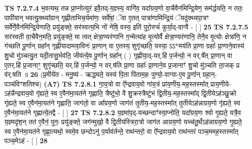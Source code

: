 \documentclass[17pt]{extarticle}
\begin{document}
                  \newline
                                \textbf{ TS 7.2.7.4} \newline
                  भ॒वत्यथ॒ तन्न प्रा॒प्नोत्युर॑ इवै॒तद्-य॒ज्ञ्स्य॒ वागि॑व॒ यदा᳚ग्रय॒णो वा॒चैवैन॑मिन्द्रि॒येण॒ सम॑र्द्धयति॒ न ततः॒ पापी॑यान् भवत्यु॒क्थ्या᳚ग्रान् गृह्णीताभिच॒र्यमा॑णः॒ सर्वे॑षां॒ ॅवा ए॒तत् पात्रा॑णामिन्द्रि॒यं ॅयदु॑क्थ्यपा॒त्रꣳ सर्वे॑णै॒वैन॑मिन्द्रि॒येणाति॒ प्रयु॑ङ्क्ते॒ सर॑स्वत्य॒भि नो॑ नेषि॒ वस्य॒ इति॑ पुरो॒रुचं॑ कुर्या॒द्-वाग्वै - [  ] \textbf{  25} \newline
                  \newline
                                \textbf{ TS 7.2.7.5} \newline
                  सर॑स्वती वा॒चैवैन॒मति॒ प्रयु॑ङ्क्ते॒ मा त्वत् क्षेत्रा॒ण्यर॑णानि ग॒न्मेत्या॑ह मृ॒त्योर्वै क्षेत्रा॒ण्यर॑णानि॒ तेनै॒व मृ॒त्योः क्षेत्रा॑णि॒ न ग॑च्छति पू॒र्णान् ग्रहा᳚न् गृह्णीयादामया॒विनः॑ प्रा॒णान् वा ए॒तस्य॒ शुगृ॑च्छति॒ यस्या॒ ऽऽ*मय॑ति प्रा॒णा ग्रहाः᳚ प्रा॒णाने॒वास्य॑ शु॒चो मु॑ञ्चत्यु॒त यदी॒तासु॒र्भव॑ति॒ जीव॑त्ये॒व पू॒र्णान् ग्रहा᳚न् ( ) गृह्णीया॒द्-यर्.हि॑ प॒र्जन्यो॒ न वर्.षे᳚त् प्रा॒णान् वा ए॒तर्.हि॑ प्र॒जानाꣳ॒॒ शुगृ॑च्छति॒ यर्.हि॑ प॒र्जन्यो॒ न वर्.ष॑ति प्रा॒णा ग्रहाः᳚ प्रा॒णाने॒व प्र॒जानाꣳ॑ शु॒चो मु॑ञ्चति ता॒जक् प्र व॑र्.षति ॥ \textbf{  26} \newline
                  \newline
                      (प्र॒मीये॑त - मनु॒ष्य॑ - ऋद्ध्यते॒ यस्य॑ पि॒ता पि॑ताम॒हः पुण्यो॒-वाग्वा-ए॒व पू॒र्णान् ग्रहा॒न्-पञ्च॑विꣳशतिश्च)  \textbf{(A7)} \newline \newline
                                        \textbf{ TS 7.2.8.1} \newline
                  गा॒य॒त्रो वा ऐ᳚न्द्रवाय॒वो गा॑य॒त्रं प्रा॑य॒णीय॒-मह॒स्तस्मा᳚त् प्राय॒णीये-ऽह॑न्नैन्द्रवाय॒वो गृ॑ह्यते॒ स्व ए॒वैन॑मा॒यत॑ने गृह्णाति॒ त्रैष्टु॑भो॒ वै शु॒क्रस्त्रैष्टु॑भं द्वि॒तीय॒-मह॒स्तस्मा᳚द् द्वि॒तीयेऽह॑ञ्छु॒क्रो गृ॑ह्यते॒ स्व ए॒वैन॑मा॒यत॑ने गृह्णाति॒ जाग॑तो॒ वा आ᳚ग्रय॒णो जाग॑तं तृ॒तीय॒-मह॒स्तस्मा᳚त् तृ॒तीयेऽह॑न्नाग्रय॒णो गृ॑ह्यते॒ स्व ए॒वैन॑मा॒यत॑ने गृह्णात्ये॒तद्वै - [  ] \textbf{  27} \newline
                  \newline
                                \textbf{ TS 7.2.8.2} \newline
                  य॒ज्ञ्मा॑प॒द्-यच्छन्दाꣳ॑स्या॒प्नोति॒ यदा᳚ग्रय॒णः श्वो गृ॒ह्यते॒ यत्रै॒व य॒ज्ञ्मदृ॑श॒न् तत॑ ए॒वैनं॒ पुनः॒ प्रयु॑ङ्क्ते॒ जग॑न्मुखो॒ वै द्वि॒तीय॑स्त्रिरा॒त्रो जाग॑त आग्रय॒णो यच्च॑तु॒र्थेऽह॑न्नाग्रय॒णो गृ॒ह्यते॒ स्व ए॒वैन॑मा॒यत॑ने गृह्णा॒त्यथो॒ स्वमे॒व छन्दोऽनु॑ प॒र्याव॑र्तन्ते॒ राथ॑न्तरो॒ वा ऐ᳚न्द्रवाय॒वो राथ॑न्तरं पञ्च॒ममह॒स्तस्मा᳚त् पञ्च॒मेऽह॑ - [  ] \textbf{  28} \newline
\end{document}
